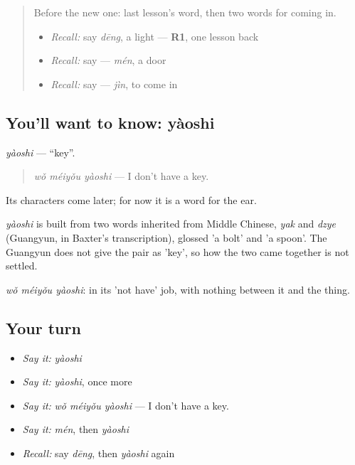 \label{lesson:ZH-C87-yaoshi}



\begin{quote}
Before the new one: last lesson's word, then two words for coming in.

\begin{itemize}
\raggedright
  \item \emph{Recall:} say \emph{dēng}, a light — \textbf{R1}, one lesson back
  \item \emph{Recall:} say  — \emph{mén}, a door
  \item \emph{Recall:} say  — \emph{jìn}, to come in
\end{itemize}
\end{quote}

\subsection*{You'll want to know: yàoshi}
\emph{yàoshi} — \textquotedblleft{}key\textquotedblright{}.

\begin{quote}
\emph{wǒ méiyǒu yàoshi} — I don't have a key.
\end{quote}

Its characters come later; for now it is a word for the ear.

\begin{cousinweb}
\emph{yàoshi} is built from two words inherited from Middle Chinese, \emph{yak} and \emph{dzye} (Guangyun, in Baxter's transcription), glossed 'a bolt' and 'a spoon'. The Guangyun does not give the pair as 'key', so how the two came together is not settled.
\end{cousinweb}

\begin{grammarlens}[title={What you've built}]
\emph{wǒ méiyǒu yàoshi}:  in its 'not have' job, with nothing between it and the thing.
\end{grammarlens}

\subsection*{Your turn}
\begin{itemize}
\raggedright
  \item \emph{Say it:} \emph{yàoshi}
  \item \emph{Say it:} \emph{yàoshi}, once more
  \item \emph{Say it:} \emph{wǒ méiyǒu yàoshi} — I don't have a key.
  \item \emph{Say it:} \emph{mén}, then \emph{yàoshi}
  \item \emph{Recall:} say \emph{dēng}, then \emph{yàoshi} again
\end{itemize}

